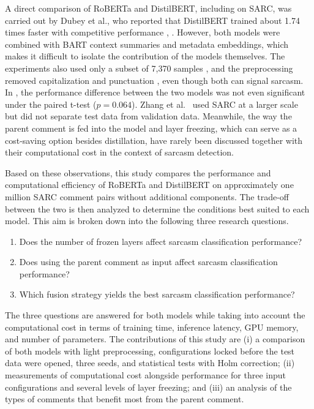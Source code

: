 \documentclass[conference]{IEEEtran}
\begin{document}
A direct comparison of RoBERTa and DistilBERT, including on SARC, was carried out by Dubey et al., who reported that DistilBERT trained about 1.74 times faster with competitive performance \cite{dubey2025unpacking}, \cite{dubey2026efficient}. However, both models were combined with BART context summaries and metadata embeddings, which makes it difficult to isolate the contribution of the models themselves. The experiments also used only a subset of 7,370 samples \cite{dubey2025unpacking}, and the preprocessing removed capitalization and punctuation \cite{dubey2026efficient}, even though both can signal sarcasm. In \cite{dubey2026efficient}, the performance difference between the two models was not even significant under the paired t-test ($p = 0.064$). Zhang et al.\ \cite{zhang2025enhancing} used SARC at a larger scale but did not separate test data from validation data. Meanwhile, the way the parent comment is fed into the model and layer freezing, which can serve as a cost-saving option besides distillation, have rarely been discussed together with their computational cost in the context of sarcasm detection.

Based on these observations, this study compares the performance and computational efficiency of RoBERTa and DistilBERT on approximately one million SARC comment pairs without additional components. The trade-off between the two is then analyzed to determine the conditions best suited to each model. This aim is broken down into the following three research questions.
\begin{enumerate}
\item Does the number of frozen layers affect sarcasm classification performance?
\item Does using the parent comment as input affect sarcasm classification performance?
\item Which fusion strategy yields the best sarcasm classification performance?
\end{enumerate}
The three questions are answered for both models while taking into account the computational cost in terms of training time, inference latency, GPU memory, and number of parameters. The contributions of this study are (i) a comparison of both models with light preprocessing, configurations locked before the test data were opened, three seeds, and statistical tests with Holm correction; (ii) measurements of computational cost alongside performance for three input configurations and several levels of layer freezing; and (iii) an analysis of the types of comments that benefit most from the parent comment.
\end{document}
